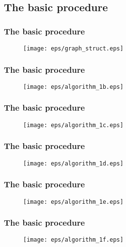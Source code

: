 \documentclass[xcolor=dvipsnames,envcountsect,handout]{beamer}
\begin{document}
\subsection{The basic procedure}


\begin{frame}
\frametitle{The basic procedure}
\begin{figure}[H]
\centering
\hspace{-12pt}
\texttt{[image: eps/graph\_struct.eps]} 
\end{figure} 
\end{frame}


\begin{frame}
\frametitle{The basic procedure}
\begin{figure}[H]
\centering
\vspace{-1pt}
\texttt{[image: eps/algorithm\_1b.eps]} 
\end{figure} 
\end{frame}


\begin{frame}
\frametitle{The basic procedure}
\begin{figure}[H]
\centering
\vspace{-0.3pt}
\texttt{[image: eps/algorithm\_1c.eps]} 
\end{figure} 
\end{frame}


\begin{frame}
\frametitle{The basic procedure}
\begin{figure}[H]
\centering
\hspace{-5pt}
\texttt{[image: eps/algorithm\_1d.eps]} 
\end{figure} 
\end{frame}


\begin{frame}
\frametitle{The basic procedure}
\begin{figure}[H]
\centering
\hspace{36pt}
\texttt{[image: eps/algorithm\_1e.eps]} 
\end{figure} 
\end{frame}


\begin{frame}
\frametitle{The basic procedure}
\begin{figure}[H]
\centering
\hspace{33pt}
\texttt{[image: eps/algorithm\_1f.eps]} 
\end{figure} 
\end{frame}
\end{document}
